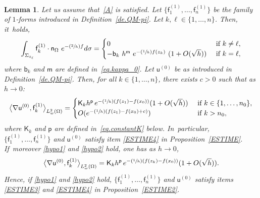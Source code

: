 \documentclass[10pt]{amsart}
\newcommand{\Psfrac}[2]{(\sfrac{#1}{#2})}
\let\lp\langle
\let\rp\rangle
\theoremstyle{plain}
\newtheorem{lemma}[proposition]{Lemma}
\theoremstyle{definition}
\begin{document}
\begin{lemma}\label{de3-boundary+interaction}
Let us assume that~\ref{A} is satisfied. Let $\{\mathsf f_1^{(1)}, \ldots, \mathsf f_n^{(1)}\} $ be the family of $1$-forms introduced in Definition~\ref{de.QM-pi}. Let $k,\ell\in \{1,\ldots,n\}$.
Then, it~holds,
\[
\int_{\Sigma_{z_\ell}} \mathsf f_k^{(1)} \cdot \mathsf n_\Omega \ e^{-\Psfrac{2}{h} f} d\sigma =\begin{cases} 0 & \text{ if } k\neq \ell,\\
-\mathsf b_k \ h^{\mathsf m } \ e^{-\Psfrac{1}{h} f(z_k)} \ (1 + O(\sqrt h)) & \text{ if } k=\ell,
\end{cases}
\]
where $\mathsf b_k$ and $\mathsf m$ are defined in~\eqref{eq.kappa_0}.
Let $\mathsf u^{(0)}$ be as introduced in Definition~\ref{de.QM-pi}. Then, for all $k \in \{1,\ldots,n\}$, there exists $c>0$ such that as $h\to 0$:
\begin{align*}
\big \lp \nabla\mathsf u^{(0)}, \mathsf f_k^{(1)}\big\rp_{L^2_w(\Omega)} =
\begin{cases} \mathsf K_kh^{\mathsf p}\, e^{-\Psfrac 1h(f(z_1)-f(x_0))} (1+O(\sqrt h)) & \text{ if } k\in \{1,\ldots,n_0\},\\
O(e^{-\Psfrac 1h(f(z_1)-f(x_0) +c)}) & \text{ if } k>n_0,
\end{cases}
\end{align*}
where $\mathsf K_k$ and $\mathsf p$ are defined in~\eqref{eq.constantK} below. In~particular, $\{\mathsf f_1^{(1)}, \ldots, \mathsf f_n^{(1)}\} $ and $\mathsf u^{(0)}$ satisfy item \eqref{ESTIME4} in Proposition~\ref{ESTIME}. If~moreover \eqref{hypo1} and \eqref{hypo2} hold, one has as $h\to 0$,
\[
\big \lp \nabla\mathsf u^{(0)}, \mathsf f_k^{(1)}\big\rp_{L^2_w(\Omega)} =\mathsf K_kh^{\mathsf p}\, e^{-\Psfrac 1h(f(z_k)-f(x_0))} (1+O(\sqrt h)).
\]
Hence, if \eqref{hypo1} and \eqref{hypo2} hold, $\{\mathsf f_1^{(1)}, \ldots, \mathsf f_n^{(1)}\} $ and $\mathsf u^{(0)}$ satisfy items \eqref{ESTIME3} and \eqref{ESTIME4} in Proposition~\ref{ESTIME2}.
\end{lemma}
\end{document}
